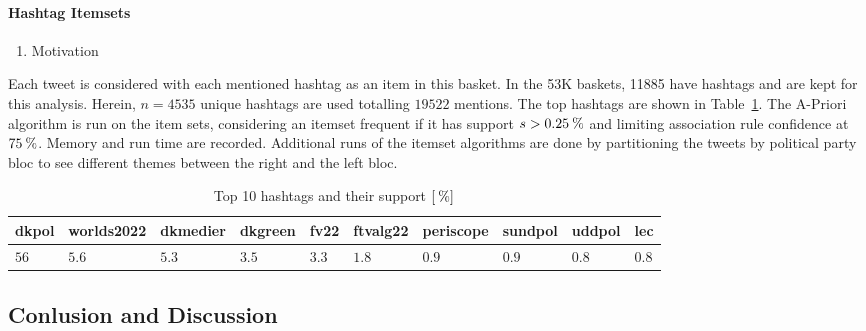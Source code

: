 \documentclass[12pt,fleqn]{article}
\begin{document}
\paragraph{Hashtag Itemsets}
\begin{enumerate}
    \item Motivation
\end{enumerate}
Each tweet is considered with each mentioned hashtag as an item in this basket.
In the 53K baskets, 11885 have hashtags and are kept for this analysis.
Herein, $n=4535$ unique hashtags are used totalling $19522$ mentions.
The top hashtags are shown in Table~\ref{tab:tophash}.
The A-Priori algorithm is run on the item sets, considering an itemset frequent if it has support $s>0.25\:\text{\%{}}$ and limiting association rule confidence at $75\:\text{\%{}}$.
Memory and run time are recorded.
Additional runs of the itemset algorithms are done by partitioning the tweets by political party bloc to see different themes between the right and the left bloc.
\begin{table}[H]
    \small
    \centering
        \begin{tabular}{llllllllll}
        dkpol & worlds2022 & dkmedier & dkgreen & fv22 & ftvalg22 & periscope & sundpol & uddpol & lec\\
            \hline
           $56$ & $5.6$ & $5.3$ & $3.5$ & $3.3$ & $1.8$ & $0.9$ & $0.9$ & $0.8$ & $0.8$
        \end{tabular}
    \caption{Top 10 hashtags and their support $[\:\text{\%{}}]$}
    \label{tab:tophash}
\end{table}\noindent

\subsection*{Conlusion and Discussion}
\end{document}
